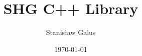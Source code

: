 \documentclass[a4paper,11pt]{report}
\title{SHG C++ Library}
\author{Stanis{\l}aw Galus}
\date{\today}
\begin{document}
\begingroup
\renewcommand{\thepage}{0}
\maketitle
\endgroup

\tableofcontents




\end{document}
